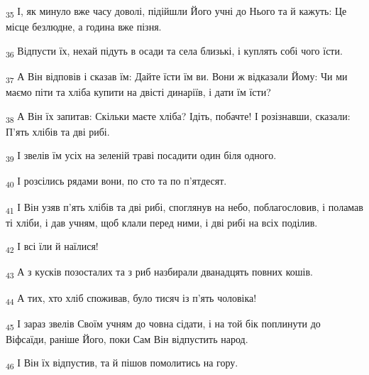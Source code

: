 \begin{tcolorbox}
\textsubscript{35} І, як минуло вже часу доволі, підійшли Його учні до Нього та й кажуть: Це місце безлюдне, а година вже пізня.
\end{tcolorbox}
\begin{tcolorbox}
\textsubscript{36} Відпусти їх, нехай підуть в осади та села близькі, і куплять собі чого їсти.
\end{tcolorbox}
\begin{tcolorbox}
\textsubscript{37} А Він відповів і сказав їм: Дайте їсти їм ви. Вони ж відказали Йому: Чи ми маємо піти та хліба купити на двісті динаріїв, і дати їм їсти?
\end{tcolorbox}
\begin{tcolorbox}
\textsubscript{38} А Він їх запитав: Скільки маєте хліба? Ідіть, побачте! І розізнавши, сказали: П'ять хлібів та дві рибі.
\end{tcolorbox}
\begin{tcolorbox}
\textsubscript{39} І звелів їм усіх на зеленій траві посадити один біля одного.
\end{tcolorbox}
\begin{tcolorbox}
\textsubscript{40} І розсілись рядами вони, по сто та по п'ятдесят.
\end{tcolorbox}
\begin{tcolorbox}
\textsubscript{41} І Він узяв п'ять хлібів та дві рибі, споглянув на небо, поблагословив, і поламав ті хліби, і дав учням, щоб клали перед ними, і дві рибі на всіх поділив.
\end{tcolorbox}
\begin{tcolorbox}
\textsubscript{42} І всі їли й наїлися!
\end{tcolorbox}
\begin{tcolorbox}
\textsubscript{43} А з кусків позосталих та з риб назбирали дванадцять повних кошів.
\end{tcolorbox}
\begin{tcolorbox}
\textsubscript{44} А тих, хто хліб споживав, було тисяч із п'ять чоловіка!
\end{tcolorbox}
\begin{tcolorbox}
\textsubscript{45} І зараз звелів Своїм учням до човна сідати, і на той бік поплинути до Віфсаїди, раніше Його, поки Сам Він відпустить народ.
\end{tcolorbox}
\begin{tcolorbox}
\textsubscript{46} І Він їх відпустив, та й пішов помолитись на гору.
\end{tcolorbox}
